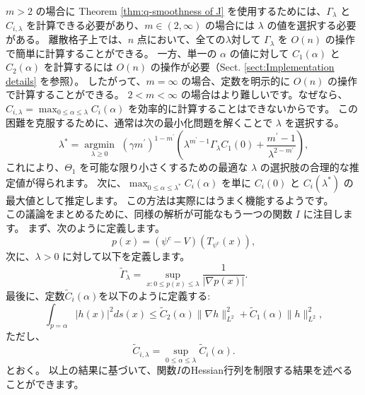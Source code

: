 \documentclass{jsarticle}
\theoremstyle{definition}
\begin{document}
$m > 2$ の場合に Theorem \ref{thm:q-smoothness of J} を使用するためには、$\Gamma_\lambda$ と $C_{i,\lambda}$ を計算できる必要があり、$m \in (2, \infty)$ の場合には $\lambda$ の値を選択する必要がある。
離散格子上では、$n$ 点において、全ての$\lambda$対して $\Gamma_\lambda$ を $O(n)$ の操作で簡単に計算することができる。
一方、単一の $\alpha$ の値に対して $C_1(\alpha)$ と $C_2(\alpha)$ を計算するには $O(n)$ の操作が必要（Sect. \ref{sect:Implementation details} を参照）。
したがって、$m = \infty$ の場合、定数を明示的に $O(n)$ の操作で計算することができる。
$2 < m < \infty$ の場合はより難しいです。なぜなら、$C_{i,\lambda} = \max_{0 \leq \alpha \leq \lambda} C_i(\alpha)$ を効率的に計算することはできないからです。
この困難を克服するために、通常は次の最小化問題を解くことで $\lambda$ を選択する。
\[
    \lambda^* = \underset{\lambda \geq 0} {\operatorname{argmin}} \, \, (\gamma m ^\prime)^{1 - m^\prime} \left(\lambda^{m^\prime - 1}\Gamma_\lambda C_1(0) + \frac{m^\prime - 1}{\lambda^{2-m^\prime}}\right),
\]
これにより、$\Theta_1$ を可能な限り小さくするための最適な $\lambda$ の選択肢の合理的な推定値が得られます。
次に、$\max_{0 \leq \alpha \leq \lambda^*} C_i(\alpha)$ を単に $C_i(0)$ と $C_i(\lambda^*)$ の最大値として推定します。
この方法は実際にはうまく機能するようです。\\

この議論をまとめるために、同様の解析が可能なもう一つの関数 $I$ に注目します。
まず、次のように定義します。
\[
    p(x) = (\psi^c - V)(T_{\psi^c}(x)),
\]
次に、$\lambda > 0$ に対して以下を定義します。
\begin{equation}
    \label{def:gamma}
    \tilde{\Gamma}_\lambda = \sup_{x: 0 \leq p(x) \leq \lambda} \frac{1}{|\nabla p(x)|}.
\end{equation}
最後に、定数$\tilde{C}_i(\alpha)$を以下のように定義する:
\[
    \int_{p = \alpha} |h(x)|^2 ds(x) \leq \tilde{C}_2(\alpha) \| \nabla h \|_{L^2}^2 + \tilde{C}_1(\alpha) \|h\|_{L^2}^2,
\]
ただし、
\begin{equation}
    \label{def:C}
    \tilde{C}_{i, \lambda} = \sup_{0 \leq \alpha \leq \lambda} \tilde{C}_i(\alpha). 
\end{equation}
とおく。
以上の結果に基づいて、関数$I$のHessian行列を制限する結果を述べることができます。
\end{document}
